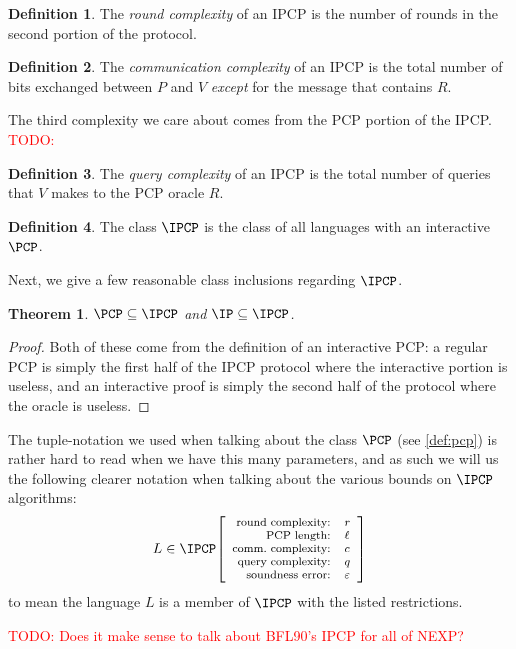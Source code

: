 \documentclass[english,12pt]{reedthesis}
\theoremstyle{plain}
\newtheorem{thm}{Theorem}[section]
\theoremstyle{definition}
\newtheorem{defn}[defn]{Definition}
\theoremstyle{remark}
\newcommand{\ipcp}[5]{%
  \ensuremath%
  \mleft[{\footnotesize\begin{array}{r l}
    \text{round complexity:} & #1 \\
    \text{PCP length:} & #2 \\
    \text{comm.\ complexity:} & #3 \\
    \text{query complexity:} & #4 \\
    \text{soundness error:} & #5
  \end{array}}\mright]%
}
\newcommand{\TODO}[1]{\textcolor{red}{TODO: #1}}
\begin{document}
\begin{defn}\label{def:ipcp-round-complexity}
  The \emph{round complexity} of an IPCP is the number of rounds in the second
  portion of the protocol.
\end{defn}

\begin{defn}\label{def:ipcp-comm-complexity}
  The \emph{communication complexity} of an IPCP is the total number of bits
  exchanged between $P$ and $V$ \emph{except} for the message that contains $R$.
\end{defn}

The third complexity we care about comes from the PCP portion of the IPCP\@.
\TODO{}

\begin{defn}
  The \emph{query complexity} of an IPCP is the total number of queries that $V$
  makes to the PCP oracle $R$.
\end{defn}

\begin{defn}\label{def:ipcp-class}
  The class $\IPCP$ is the class of all languages with an interactive $\PCP$.
\end{defn}

Next, we give a few reasonable class inclusions regarding $\IPCP$.

\begin{thm}
  $\PCP \subseteq \IPCP$ and $\IP \subseteq \IPCP$.
\end{thm}

\begin{proof}
  Both of these come from the definition of an interactive PCP: a regular PCP is
  simply the first half of the IPCP protocol where the interactive portion is
  useless, and an interactive proof is simply the second half of the protocol
  where the oracle is useless.
\end{proof}

The tuple-notation we used when talking about the class $\PCP$ (see
\cref{def:pcp}) is rather hard to read when we have this many parameters, and as
such we will us the following clearer notation when talking about the various
bounds on $\IPCP$ algorithms:
\begin{equation*}
  L \in \IPCP\ipcp{r}{\ell}{c}{q}{\varepsilon}
\end{equation*}
to mean the language $L$ is a member of $\IPCP$ with the listed restrictions.

\TODO{Does it make sense to talk about BFL90's IPCP for all of NEXP?}
\end{document}
